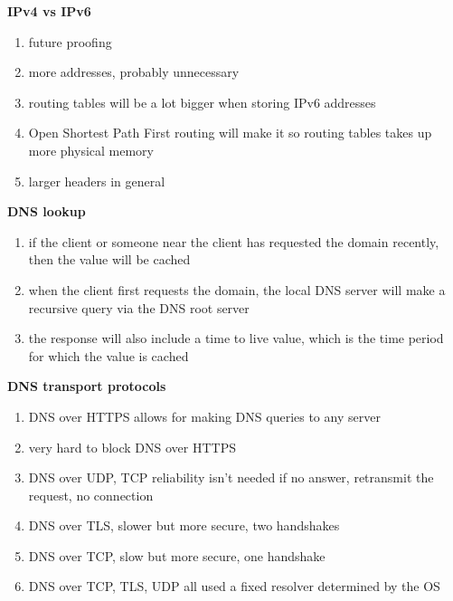 \documentclass{article}
\begin{document}
\textbf{IPv4 vs IPv6}
\begin{enumerate}
    \item future proofing
    \item more addresses, probably unnecessary
    \item routing tables will be a lot bigger when storing IPv6 addresses
    \item Open Shortest Path First routing will make it so routing tables takes up more physical memory
    \item larger headers in general
\end{enumerate}


\textbf{DNS lookup}
\begin{enumerate}
    \item if the client or someone near the client has requested the domain recently, then the value will be cached
    \item when the client first requests the domain, the local DNS server will make a recursive query via the DNS root server
    \item the response will also include a time to live value, which is the time period for which the value is cached
\end{enumerate}


\textbf{DNS transport protocols}
\begin{enumerate}
    \item DNS over HTTPS allows for making DNS queries to any server
    \item very hard to block DNS over HTTPS
    \item DNS over UDP, TCP reliability isn't needed \- if no answer, retransmit the request, no connection
    \item DNS over TLS, slower but more secure, two handshakes
    \item DNS over TCP, slow but more secure, one handshake
    \item DNS over TCP, TLS, UDP all used a fixed resolver determined by the OS
\end{enumerate}
\end{document}
